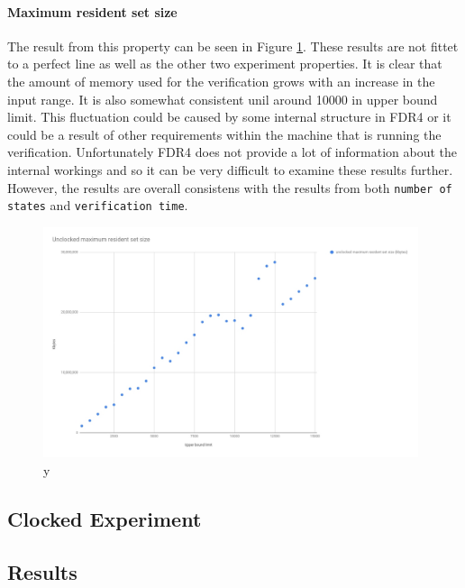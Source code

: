 \paragraph{Maximum resident set size}
The result from this property can be seen in Figure \ref{fig:unclocked_resident_size}. These results are not fittet to a perfect line as well as the other two experiment properties. It is clear that the amount of memory used for the verification grows with an increase in the input range. It is also somewhat consistent unil around 10000 in upper bound limit. This fluctuation could be caused by some internal structure in FDR4 or it could be a result of other requirements within the machine that is running the verification. Unfortunately FDR4 does not provide a lot of information about the internal workings and so it can be very difficult to examine these results further. However, the results are overall consistens with the results from both \texttt{number of states} and \texttt{verification time}.
\begin{figure}
    \includegraphics[width=0.98\textwidth]{./figures/15-11-2018/unclocked_maximum_resident_set_size.jpg}
\caption{y}
\label{fig:unclocked_resident_size}
\end{figure}



\subsection{Clocked Experiment}
\subsection{Results}

